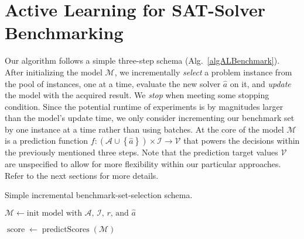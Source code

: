 \documentclass[runningheads]{llncs}
\begin{document}
\section{Active Learning for SAT-Solver Benchmarking}
\label{sec:main}
Our algorithm follows a simple three-step schema (Alg.~\ref{algALBenchmark}). After initializing the model $\mathcal{M}$, we incrementally \textit{select} a problem instance from the pool of instances, one at a time, evaluate the new solver $\hat{a}$ on it, and \textit{update} the model with the acquired result. We \textit{stop} when meeting some stopping condition.
Since the potential runtime of experiments is by magnitudes larger than the model's update time, we only consider incrementing our benchmark set by one instance at a time rather than using batches.
At the core of the model $\mathcal{M}$ is a prediction function $f\!: \left(\mathcal{A} \cup \left\lbrace \hat{a} \right\rbrace\right) \times \mathcal{I} \rightarrow \mathcal{V}$ that powers the decisions within the previously mentioned three steps.
Note that the prediction target values $\mathcal{V}$ are unspecified to allow for more flexibility within our particular approaches.
Refer to the next sections for more details.

\begin{algorithm}
  \caption{Simple incremental benchmark-set-selection schema.}
  \label{algALBenchmark}


  $\mathcal{M} \leftarrow \textrm{init model with $\mathcal{A}$, $\mathcal{I}$, $r$, and $\hat{a}$}$


  $\operatorname{score} \leftarrow \operatorname{predictScores}\!\left(\mathcal{M}\right)$

\end{algorithm}
\end{document}
